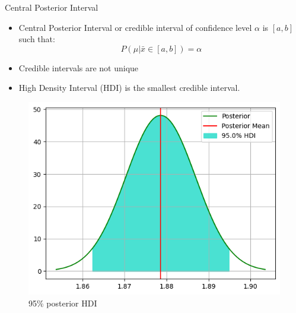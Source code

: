 \begin{frame}{Central Posterior Interval}

  \begin{itemize}
    \item Central Posterior Interval or credible interval of confidence level $\alpha$ is $[a, b]$ such that:
    \[ P(\mu | \bar{x} \in [a, b]) = \alpha \]
    \item Credible intervals are not unique
    \item High Density Interval (HDI) is the smallest credible interval.
  \end{itemize}

  \begin{figure}
    \centering
    \includegraphics[width=.6\textwidth]{../Report/images/hdi.png}
    \caption{95\% posterior HDI}
  \end{figure}
  
\end{frame}
